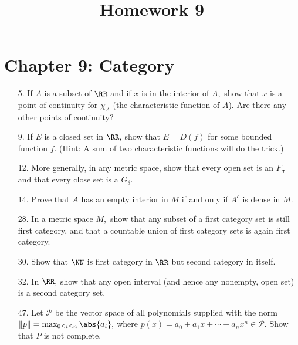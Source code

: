 \documentclass{article}
\begin{document}
\title{Homework 9}
\maketitle
\thispagestyle{fancy}

\section*{Chapter 9: Category}

\begin{itemize}
	\item[5.] If $A$ is a subset of $\RR$ and if $x$ is in the interior of $A,$ show that $x$ is a point of continuity for $\chi_A$ (the characteristic function of $A$). Are there any other points of continuity?

	\item[9.] If $E$ is a closed set in $\RR,$ show that $E=D(f)$ for some bounded function $f.$ (Hint: A sum of two characteristic functions will do the trick.)

	\item[12.] More generally, in any metric space, show that every open set is an $F_\sigma$ and that every close set is a $G_\delta.$

	\item[14.] Prove that $A$ has an empty interior in $M$ if and only if $A^c$ is dense in $M.$

	\item[28.] In a metric space $M,$ show that any subset of a first category set is still first category, and that a countable union of first category sets is again first category.
		
	\item[30.] Show that $\NN$ is first category in $\RR$ but second category in itself.

	\item[32.] In $\RR,$ show that any open interval (and hence any nonempty, open set) is a second category set.

	\item[47.] Let $\mathcal P$ be the vector space of all polynomials supplied with the norm $\left\lVert p \right\rVert = \max_{0\le i\le n} \abs{a_i},$ where $p(x)=a_0+a_1x+\cdots+a_n x^n\in\mathcal P.$ Show that $P$ is not complete.
		
\end{itemize}
\end{document}
